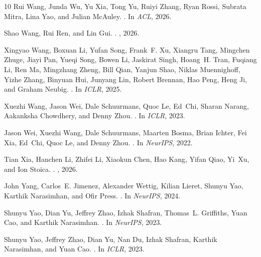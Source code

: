 \begin{thebibliography}{10}
Rui Wang, Junda Wu, Yu Xia, Tong Yu, Ruiyi Zhang, Ryan Rossi, Subrata Mitra,
  Lina Yao, and Julian McAuley.
.
\newblock In {\em ACL}, 2026.

Shao Wang, Rui Ren, and Lin Gui.
.
, 2026.

Xingyao Wang, Boxuan Li, Yufan Song, Frank~F. Xu, Xiangru Tang, Mingchen Zhuge,
  Jiayi Pan, Yueqi Song, Bowen Li, Jaskirat Singh, Hoang~H. Tran, Fuqiang Li,
  Ren Ma, Mingzhang Zheng, Bill Qian, Yanjun Shao, Niklas Muennighoff, Yizhe
  Zhang, Binyuan Hui, Junyang Lin, Robert Brennan, Hao Peng, Heng Ji, and
  Graham Neubig.
.
\newblock In {\em ICLR}, 2025.

Xuezhi Wang, Jason Wei, Dale Schuurmans, Quoc Le, Ed~Chi, Sharan Narang,
  Aakanksha Chowdhery, and Denny Zhou.
.
\newblock In {\em ICLR}, 2023.

Jason Wei, Xuezhi Wang, Dale Schuurmans, Maarten Bosma, Brian Ichter, Fei Xia,
  Ed~Chi, Quoc Le, and Denny Zhou.
.
\newblock In {\em NeurIPS}, 2022.

Tian Xia, Hanchen Li, Zhifei Li, Xiaokun Chen, Hao Kang, Yifan Qiao, Yi~Xu, and
  Ion Stoica.
.
, 2026.

John Yang, Carlos~E. Jimenez, Alexander Wettig, Kilian Lieret, Shunyu Yao,
  Karthik Narasimhan, and Ofir Press.
.
\newblock In {\em NeurIPS}, 2024.

Shunyu Yao, Dian Yu, Jeffrey Zhao, Izhak Shafran, Thomas~L. Griffiths, Yuan
  Cao, and Karthik Narasimhan.
.
\newblock In {\em NeurIPS}, 2023.

Shunyu Yao, Jeffrey Zhao, Dian Yu, Nan Du, Izhak Shafran, Karthik Narasimhan,
  and Yuan Cao.
.
\newblock In {\em ICLR}, 2023.


\end{thebibliography}
